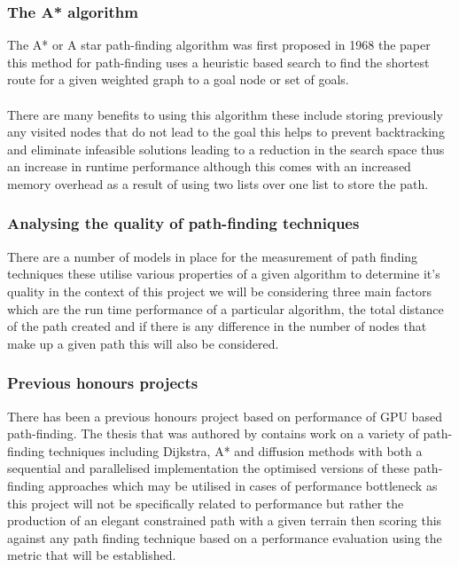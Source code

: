 \subsubsection{The A* algorithm}
The A* or A star path-finding algorithm was first proposed in 1968 the paper \cite{A*} this method for path-finding uses a heuristic based search to find the shortest route for a given weighted graph to a goal node or set of goals.\\\\ There are many benefits to using this algorithm these include storing previously any visited nodes that do not lead to the goal this helps to prevent backtracking and eliminate infeasible solutions leading to a reduction in the search space thus an increase in runtime performance although this comes with an increased memory overhead as a result of using two lists over one list to store the path.   
\subsubsection{Analysing the quality of path-finding techniques}
\label{quality}
There are a number of models in place for the measurement of path finding techniques these utilise various properties of a given algorithm to determine it's quality in the context of this project we will be considering three main factors which are the run time performance of a particular algorithm, the total distance of the path created and if there is any difference in the number of nodes that make up a given path this will also be considered. 

\subsubsection{Previous honours projects}
There has been a previous honours project based on performance of GPU based path-finding. The thesis that was authored by \cite{honours} contains work on a variety of path-finding techniques including Dijkstra, A* and diffusion methods with both a sequential and parallelised implementation the optimised versions of these path-finding approaches which may be utilised in cases of performance bottleneck as this project will not be specifically related to performance but rather the production of an elegant constrained path with a given terrain then scoring this against any path finding technique based on a performance evaluation using the metric that will be established.


